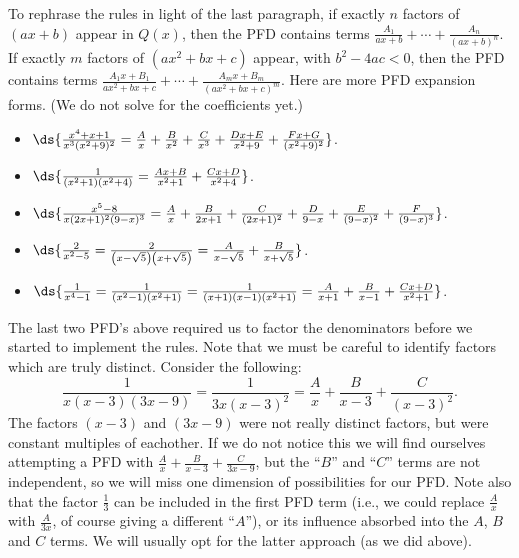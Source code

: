 To rephrase the rules in light of the last paragraph,
if exactly $n$ factors of $(ax+b)$ appear in $Q(x)$, then
the PFD  contains terms 
$\frac{A_1}{ax+b}+\cdots+\frac{A_n}{(ax+b)^n}$.
If exactly  $m$ factors of $(ax^2+bx+c)$ appear, with $b^2-4ac<0$,
then the PFD contains terms
$\frac{A_1x+B_1}{ax^2+bx+c}+\cdots+\frac{A_mx+B_m}{(ax^2+bx+c)^m}$.
\bex Here are more PFD expansion forms.  (We do not solve for the 
     coefficients yet.)
\begin{itemize}
\item $\ds{\frac{x^4+x+1}{x^3(x^2+9)^2}
     =\frac{A}x+\frac{B}{x^2}+\frac{C}{x^3}
      +\frac{Dx+E}{x^2+9}+\frac{Fx+G}{(x^2+9)^2}}$.
\item $\ds{\frac1{(x^2+1)(x^2+4)}=\frac{Ax+B}{x^2+1}+\frac{Cx+D}{x^2+4}}$.
\item $\ds{\frac{x^5-8}{x(2x+1)^2(9-x)^3}
 =\frac{A}x+\frac{B}{2x+1}+\frac{C}{(2x+1)^2}
   +\frac{D}{9-x}+\frac{E}{(9-x)^2}+\frac{F}{(9-x)^3}}$.
\item $\ds{\frac2{x^2-5}=\frac2{\left(x-\sqrt5\right)\left(x+\sqrt5\right)}
     =\frac{A}{x-\sqrt5}+\frac{B}{x+\sqrt5}}$.
\item $\ds{\frac1{x^4-1}=\frac1{(x^2-1)(x^2+1)}
       =\frac1{(x+1)(x-1)(x^2+1)}
       =\frac{A}{x+1}+\frac{B}{x-1}+\frac{Cx+D}{x^2+1}}$.
\end{itemize}
\eex

The last two PFD's above required us to factor the denominators before
we started to implement the rules.  Note that we must be careful
to identify factors which are truly distinct.  Consider the following:
$$\frac1{x(x-3)(3x-9)}=\frac1{3x(x-3)^2}
=\frac{A}x+\frac{B}{x-3}+\frac{C}{(x-3)^2}.$$
The factors $(x-3)$ and $(3x-9)$ were not really distinct factors,
but were constant multiples of eachother.  If we do not notice this
we will find ourselves attempting a PFD 
with $\frac{A}{x}+\frac{B}{x-3}+\frac{C}{3x-9}$, but
the ``$B$'' and ``$C$'' terms are not independent, so we will miss
one dimension of possibilities for our PFD.  
Note also that the
factor $\frac13$ can be included in the first PFD term
(i.e., we could replace $\frac{A}x$ with $\frac{A}{3x}$, of course giving
a different ``$A$''), or its influence absorbed into the $A$, $B$ and $C$
terms.  We will usually opt for the latter approach (as we did above).

